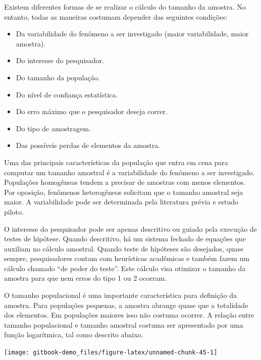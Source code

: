 \documentclass[
]{book}
\providecommand{\tightlist}{%
  \setlength{\itemsep}{0pt}\setlength{\parskip}{0pt}}
\begin{document}
Existem diferentes formas de se realizar o cálculo do tamanho da amostra. No entanto, todas as maneiras costumam depender das seguintes condições:

\begin{itemize}
\tightlist
\item
  Da variabilidade do fenômeno a ser investigado (maior variabilidade, maior amostra).\\
\item
  Do interesse do pesquisador.\\
\item
  Do tamanho da população.\\
\item
  Do nível de confiança estatística.\\
\item
  Do erro máximo que o pesquisador deseja correr.\\
\item
  Do tipo de amostragem.
\item
  Das possíveis perdas de elementos da amostra.
\end{itemize}

Uma das principais características da população que entra em cena para computar um tamanho amostral é a variabilidade do fenômeno a ser investigado. Populações homogêneas tendem a precisar de amostras com menos elementos. Por oposição, fenômenos heterogêneos solicitam que o tamanho amostral seja maior. A variabilidade pode ser determinada pela literatura prévia e estudo piloto.

O interesse do pesquisador pode ser apenas descritivo ou guiado pela execução de testes de hipótese. Quando descritivo, há um sistema fechado de equações que auxiliam no cálculo amostral. Quando teste de hipóteses são desejados, quase sempre, pesquisadores contam com heurísticas acadêmicas e também fazem um cálculo chamado ``de poder do teste''. Este cálculo visa otimizar o tamanho da amostra para que nem erros do tipo 1 ou 2 ocorram.

O tamanho populacional é uma importante característica para definição da amostra. Para populações pequenas, a amostra abrange quase que a totalidade dos elementos. Em populações maiores isso não costuma ocorrer. A relação entre tamanho populacional e tamanho amostral costuma ser apresentado por uma função logarítmica, tal como descrito abaixo.

\begin{center}\texttt{[image: gitbook-demo\_files/figure-latex/unnamed-chunk-45-1]} \end{center}
\end{document}
